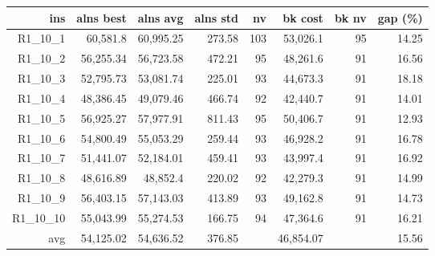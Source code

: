   \begin{table}[caption={Kết quả đo với tập HG\_R\_1\_10 1000 yêu cầu}, label=exp:HGR110]
    \centering
    \begin{tabular}{rrrrrrrr}
    \hline
    ins & alns best & alns avg & alns std & nv & bk cost & bk nv & gap (\%) \\ \hline
    R1\_10\_1 & 60,581.8 & 60,995.25 & 273.58 & 103 & 53,026.1 & 95 & 14.25 \\ \hline
    R1\_10\_2 & 56,255.34 & 56,723.58 & 472.21 & 95 & 48,261.6 & 91 & 16.56 \\ \hline
    R1\_10\_3 & 52,795.73 & 53,081.74 & 225.01 & 93 & 44,673.3 & 91 & 18.18 \\ \hline
    R1\_10\_4 & 48,386.45 & 49,079.46 & 466.74 & 92 & 42,440.7 & 91 & 14.01 \\ \hline
    R1\_10\_5 & 56,925.27 & 57,977.91 & 811.43 & 95 & 50,406.7 & 91 & 12.93 \\ \hline
    R1\_10\_6 & 54,800.49 & 55,053.29 & 259.44 & 93 & 46,928.2 & 91 & 16.78 \\ \hline
    R1\_10\_7 & 51,441.07 & 52,184.01 & 459.41 & 93 & 43,997.4 & 91 & 16.92 \\ \hline
    R1\_10\_8 & 48,616.89 & 48,852.4 & 220.02 & 92 & 42,279.3 & 91 & 14.99 \\ \hline
    R1\_10\_9 & 56,403.15 & 57,143.03 & 413.89 & 93 & 49,162.8 & 91 & 14.73 \\ \hline
    R1\_10\_10 & 55,043.99 & 55,274.53 & 166.75 & 94 & 47,364.6 & 91 & 16.21 \\ \hline
    avg & 54,125.02 & 54,636.52 & 376.85 & & 46,854.07 & & 15.56 \\ \hline
    \end{tabular}
  \end{table}

